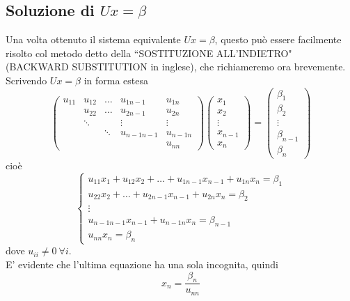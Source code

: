 \documentclass[12pt,a4paper]{article}
\begin{document}
\subsection{Soluzione di $Ux=\beta$}
Una volta ottenuto il sistema equivalente $Ux=\beta$, questo può essere facilmente risolto col metodo detto della ``SOSTITUZIONE ALL'INDIETRO" (BACKWARD SUBSTITUTION in inglese), che richiameremo ora brevemente. \\
Scrivendo $Ux=\beta$ in forma estesa
\begin{equation*}
    \begin{pmatrix}
        u_{11} & u_{12} & \dots & u_{1n-1} & u_{1n} \\ 
        & u_{22} & \dots & u_{2n-1} & u_{2n} \\ 
        & \ddots &  & \vdots & \vdots \\ 
        &  & \ddots  & u_{n-1n-1} & u_{n-1n} \\ 
        &  &  &  & u_{nn} 
    \end{pmatrix} 
    \begin{pmatrix}
        x_1 \\ 
        x_2 \\ 
        \vdots \\ 
        x_{n-1} \\ 
        x_n 
    \end{pmatrix} = 
    \begin{pmatrix}
        \beta_1 \\ 
        \beta_2 \\ 
        \vdots \\ 
        \beta_{n-1} \\ 
        \beta_n 
    \end{pmatrix}
\end{equation*}
cioè
\begin{equation*}
    \begin{cases}
u_{11}x_1 +u_{12}x_2 + \dots + u_{1n-1}x_{n-1} + u_{1n}x_n = \beta_1\\ 
 u_{22}x_2 + \dots +u_{2n-1}x_{n-1} + u_{2n}x_n = \beta_2\\ 
\vdots  \\ 
 u_{n-1n-1}x_{n-1} + u_{n-1n}x_n = \beta_{n-1}\\ 
 u_{nn}x_n = \beta_{n}
\end{cases}
\end{equation*}
dove $u_{ii}\neq 0 \ \forall i$.\\
E' evidente che l'ultima equazione ha una sola incognita, quindi 
\begin{equation*}
    x_n = \frac{\beta_n}{u_{nn}}
\end{equation*}
\end{document}
